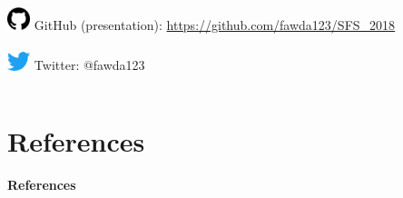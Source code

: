 \documentclass[serif]{beamer}\usepackage[]{graphicx}\usepackage[]{color}
\begin{document}
\begin{frame}
\begin{columns}
\begin{column}{0.5\textwidth}
\includegraphics[width = 0.05\textwidth]{fig/git.png} GitHub (presentation): \href{https://github.com/fawda123/SFS_2018}{https://github.com/fawda123/SFS\_2018}\\~\\
\includegraphics[width = 0.05\textwidth]{fig/twitter.png} Twitter: @fawda123
\end{column}
\end{columns}
\vspace{0.2in}
\end{frame}

\section{References}
\begin{frame}[t,shrink]{\textbf{References}}
\tiny
{}

% 

\end{frame}
\end{document}
